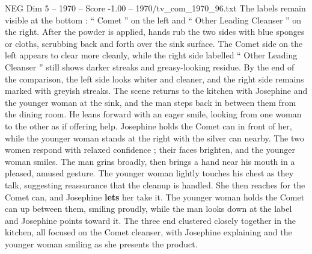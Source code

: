 \begin{textsample}{NEG Dim 5 – 1970 – Score -1.00 – 1970/tv\_com\_1970\_96.txt}
The labels remain visible at the bottom : “ Comet ” on the left and “ Other Leading Cleanser ” on the right.
After the powder is applied, hands rub the two sides with blue sponges or cloths, scrubbing back and forth over the sink surface.
The Comet side on the left appears to clear more cleanly, while the right side labelled “ Other Leading Cleanser ” still shows darker streaks and greasy-looking residue.
By the end of the comparison, the left side looks whiter and cleaner, and the right side remains marked with greyish streaks.
The scene returns to the kitchen with Josephine and the younger woman at the sink, and the man steps back in between them from the dining room.
He leans forward with an eager smile, looking from one woman to the other as if offering help.
Josephine holds the Comet can in front of her, while the younger woman stands at the right with the silver can nearby.
The two women respond with relaxed confidence ; their faces brighten, and the younger woman smiles.
The man grins broadly, then brings a hand near his mouth in a pleased, amused gesture.
The younger woman lightly touches his chest as they talk, suggesting reassurance that the cleanup is handled.
She then reaches for the Comet can, and Josephine \textbf{lets} her take it.
The younger woman holds the Comet can up between them, smiling proudly, while the man looks down at the label and Josephine points toward it.
The three end clustered closely together in the kitchen, all focused on the Comet cleanser, with Josephine explaining and the younger woman smiling as she presents the product.

\end{textsample}
